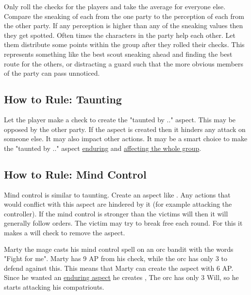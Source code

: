 \documentclass[11pt]{article}
\begin{document}
{Only roll the checks for the players and take the average for everyone else. Compare the sneaking of each from the one party to the perception of each from the other party. If any perception is higher than any of the sneaking values then they get spotted.
Often times the characters in the party help each other. Let them distribute some points within the group after they rolled their checks. This represents something like the best scout sneaking ahead and finding the best route for the others, or distracting a guard such that the more obvious members of the party can pass unnoticed.

\subsection{How to Rule: Taunting}
\label{sec:org4d9f065}
Let the player make a check to create the "taunted by .." aspect. This may be opposed by the other party. If the aspect is created then it hinders any attack on someone else. It may also impact other actions. It may be a smart choice to make the "taunted by .." aspect \hyperref[sec:orgbfa3fe3]{enduring} and \hyperref[sec:orgbc8c7a2]{affecting the whole group}. 

\subsection{How to Rule: Mind Control}
\label{sec:org0f86559}
Mind control is similar to taunting. Create an aspect like . Any actions that would conflict with this aspect are hindered by it (for example attacking the controller). If the mind control is stronger than the victims will then it will generally follow orders. The victim may try to break free each round. For this it makes a will check to remove the  aspect.

\begin{pwexample}
Marty the mage casts his mind control spell on an orc bandit with the words "Fight for me". Marty has 9 AP from his check, while the orc has only 3 to defend against this. This means that Marty can create the aspect with 6 AP. Since he wanted an \hyperref[sec:orgbfa3fe3]{enduring aspect} he creates , The orc has only 3 Will, so he starts attacking his compatriouts. 
\end{pwexample}

}
\end{document}
